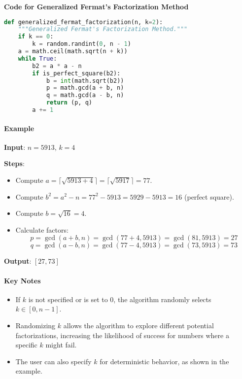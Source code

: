 \documentclass[12pt]{report}
\begin{document}
\begin{center}
    \item \textbf{Code for Generalized Fermat’s Factorization Method}
\end{center}

\begin{lstlisting}[language=Python]
def generalized_fermat_factorization(n, k=2):
    """Generalized Fermat's Factorization Method."""
    if k == 0:
        k = random.randint(0, n - 1)
    a = math.ceil(math.sqrt(n + k))
    while True:
        b2 = a * a - n
        if is_perfect_square(b2):
            b = int(math.sqrt(b2))
            p = math.gcd(a + b, n)
            q = math.gcd(a - b, n)
            return (p, q)
        a += 1
\end{lstlisting}

\paragraph{Example}

\textbf{Input}: $n = 5913$, $k = 4$  

\textbf{Steps}:  
\begin{itemize}
    \item Compute $a = \lceil \sqrt{5913 + 4} \rceil = \lceil \sqrt{5917} \rceil = 77$.
    \item Compute $b^2 = a^2 - n = 77^2 - 5913 = 5929 - 5913 = 16$ (perfect square).
    \item Compute $b = \sqrt{16} = 4$.
    \item Calculate factors:
\[
    p = \gcd(a + b, n) = \gcd(77 + 4, 5913) = \gcd(81, 5913) = 27
\]
\[
    q = \gcd(a - b, n) = \gcd(77 - 4, 5913) = \gcd(73, 5913) = 73
\]
\end{itemize}

\textbf{Output}: $[27, 73]$  

\paragraph{Key Notes}
\begin{itemize}
    \item If $k$ is not specified or is set to $0$, the algorithm randomly selects $k \in [0, n-1]$.
    \item Randomizing $k$ allows the algorithm to explore different potential factorizations, increasing the likelihood of success for numbers where a specific $k$ might fail.
    \item The user can also specify $k$ for deterministic behavior, as shown in the example.
\end{itemize}
\end{document}
